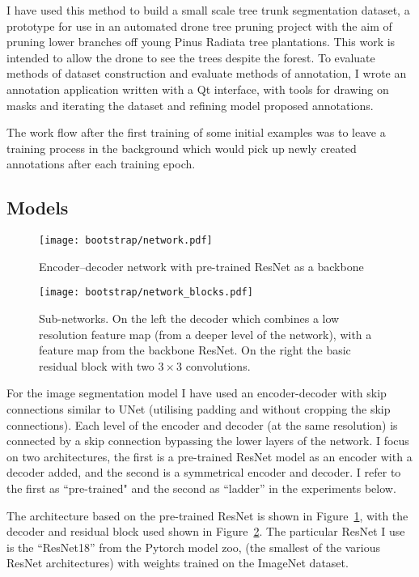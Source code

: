 I have used this method to build a small scale tree trunk segmentation dataset, a prototype for use in an automated drone tree pruning project with the aim of pruning lower branches off young Pinus Radiata tree plantations. This work is intended to allow the drone to see the trees despite the forest. To evaluate methods of dataset construction and evaluate methods of annotation, I wrote an annotation application written with a Qt interface, with tools for drawing on masks and iterating the dataset and refining model proposed annotations.

The work flow after the first training of some initial  examples was to leave a training process in the background which would pick up newly created annotations after each training epoch. 


\subsection {Models}

\begin{figure}[h]
  \centering
  \texttt{[image: bootstrap/network.pdf]}
  \caption{Encoder--decoder network with pre-trained ResNet as a backbone}  
  \label{fig:bootstrap_network}
\end{figure}
\begin{figure}
  \centering
  \texttt{[image: bootstrap/network\_blocks.pdf]}
  \caption{Sub-networks. On the left the decoder which combines a low resolution feature map (from a deeper level of the network), with a feature map from the backbone ResNet. On the right the basic residual block with two $3\times3$ convolutions. }  
  \label{fig:bootstrap_decode_block}
\end{figure}

For the image segmentation model I have used an encoder-decoder with skip connections similar to UNet \cite{Ronneberger2015} (utilising padding and without cropping the skip connections). Each level of the encoder and decoder (at the same resolution) is connected by a skip connection bypassing the lower layers of the network. I focus on two architectures, the first is a pre-trained ResNet model as an encoder with a decoder added, and the second is a symmetrical encoder and decoder. I refer to the first as ``pre-trained" and the second as ``ladder'' in the experiments below.

The architecture based on the pre-trained ResNet is shown in Figure~\ref{fig:bootstrap_network}, with the decoder and residual block used shown in Figure~\ref{fig:bootstrap_decode_block}. The particular ResNet I use is the ``ResNet18'' from the Pytorch model zoo, (the smallest of the various ResNet architectures) with weights trained on the ImageNet dataset. 

